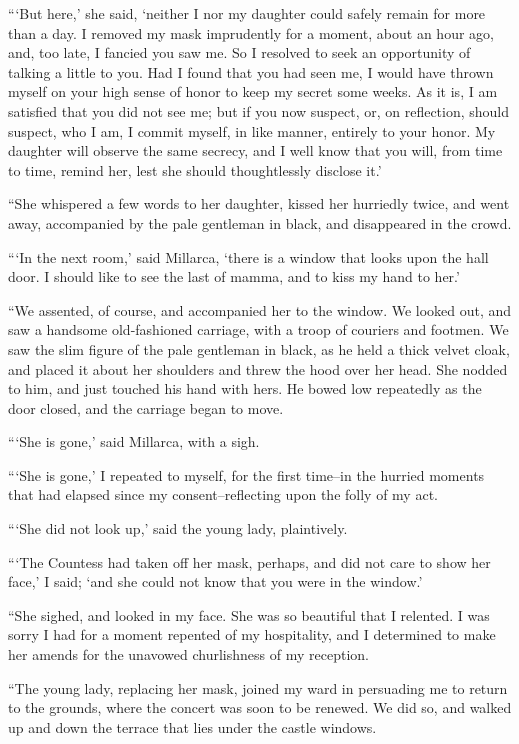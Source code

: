 \documentclass[11pt,twoside,makeidx,hidelinks,]{memoir}
\begin{document}
``{}`But here,' she said, `neither I nor my daughter could safely remain
for more than a day. I removed my mask imprudently for a moment, about
an hour ago, and, too late, I fancied you saw me. So I resolved to seek
an opportunity of talking a little to you. Had I found that you had seen
me, I would have thrown myself on your high sense of honor to keep my
secret some weeks. As it is, I am satisfied that you did not see me; but
if you now suspect, or, on reflection, should suspect, who I am, I
commit myself, in like manner, entirely to your honor. My daughter will
observe the same secrecy, and I well know that you will, from time to
time, remind her, lest she should thoughtlessly disclose it.'

``She whispered a few words to her daughter, kissed her hurriedly twice,
and went away, accompanied by the pale gentleman in black, and
disappeared in the crowd.

``{}`In the next room,' said Millarca, `there is a window that looks upon
the hall door. I should like to see the last of mamma, and to kiss my
hand to her.'

``We assented, of course, and accompanied her to the window. We looked
out, and saw a handsome old-fashioned carriage, with a troop of couriers
and footmen. We saw the slim figure of the pale gentleman in black, as
he held a thick velvet cloak, and placed it about her shoulders and
threw the hood over her head. She nodded to him, and just touched his
hand with hers. He bowed low repeatedly as the door closed, and the
carriage began to move.

``{}`She is gone,' said Millarca, with a sigh.

``{}`She is gone,' I repeated to myself, for the first time--in the hurried
moments that had elapsed since my consent--reflecting upon the folly
of my act.

``{}`She did not look up,' said the young lady, plaintively.

``{}`The Countess had taken off her mask, perhaps, and did not care to show
her face,' I said; `and she could not know that you were in the window.'

``She sighed, and looked in my face. She was so beautiful that I
relented. I was sorry I had for a moment repented of my hospitality, and
I determined to make her amends for the unavowed churlishness of my
reception.

``The young lady, replacing her mask, joined my ward in persuading me to
return to the grounds, where the concert was soon to be renewed. We did
so, and walked up and down the terrace that lies under the
castle windows.
\end{document}
